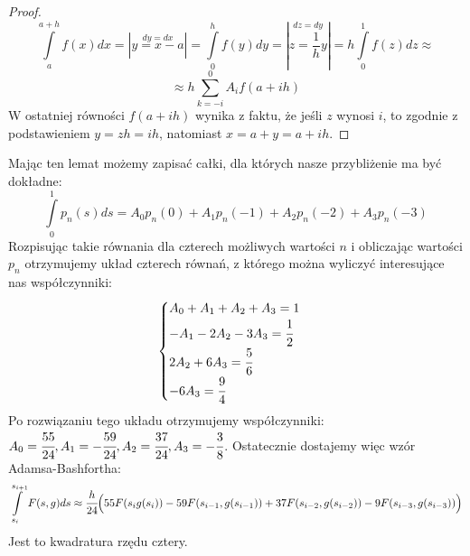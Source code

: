 \documentclass[a4paper]{article}
\begin{document}
\begin{proof}
$$\int\limits_a^{a+h} f(x)dx =| \stackrel{dy=dx}{y=x-a}| = \int\limits_0^h f(y)dy = |\stackrel{dz=dy}{z=\frac{1}{h}y} | = h \int\limits_0^1 f(z)dz \approx$$
$$\approx h\sum_{k=-i}^0 A_i f(a+ih)$$
W ostatniej równości $f(a+ih)$ wynika z faktu, że jeśli $z$ wynosi $i$, to zgodnie z podstawieniem $y = zh = ih$, natomiast $x = a+y = a+ih$.
\end{proof}
Mając ten lemat możemy zapisać całki, dla których nasze przybliżenie ma być dokładne:
$$\int\limits_0^1 p_n(s) ds = A_0p_n(0) + A_1p_n(-1) + A_2p_n(-2) + A_3p_n(-3)$$
Rozpisując takie równania dla czterech możliwych wartości $n$ i obliczając wartości $p_n$ otrzymujemy układ czterech równań, z którego można wyliczyć interesujące nas współczynniki:
$$\begin{cases}
A_0 + A_1 + A_2 + A_3 = 1\\
-A_1 -2A_2 -3A_3 = \cfrac{1}{2}\\
2A_2 + 6A_3 = \cfrac{5}{6}\\
-6A_3 = \cfrac{9}{4}
\end{cases}$$
Po rozwiązaniu tego układu otrzymujemy współczynniki: $A_0 = \cfrac{55}{24}, A_1 = -\cfrac{59}{24}, A_2 = \cfrac{37}{24}, A_3 = -\cfrac{3}{8}$. Ostatecznie dostajemy więc wzór Adamsa-Bashfortha:
\begin{equation}\label{AB}
\int\limits_{s_i}^{s_{i+1}} F(s,g) ds \approx \cfrac{h}{24}\Bigl(55F(s_ig(s_i)) - 59F(s_{i-1},g(s_{i-1})) + 37F(s_{i-2},g(s_{i-2})) - 9F(s_{i-3},g(s_{i-3}))\Bigr)
\end{equation}
Jest to kwadratura rzędu cztery.\\
\end{document}
